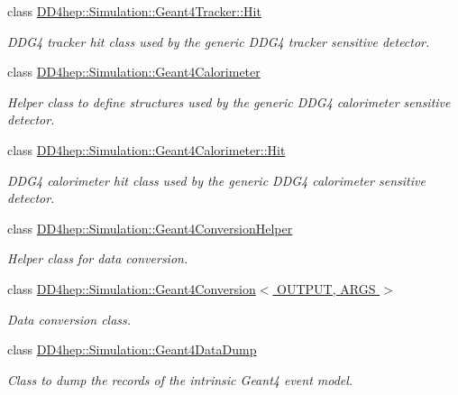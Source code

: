 \begin{DoxyCompactItemize}
class \hyperlink{class_d_d4hep_1_1_simulation_1_1_geant4_tracker_1_1_hit}{DD4hep::Simulation::Geant4Tracker::Hit}
\begin{DoxyCompactList}\small\item\em DDG4 tracker hit class used by the generic DDG4 tracker sensitive detector. \item\end{DoxyCompactList}\item 
class \hyperlink{class_d_d4hep_1_1_simulation_1_1_geant4_calorimeter}{DD4hep::Simulation::Geant4Calorimeter}
\begin{DoxyCompactList}\small\item\em Helper class to define structures used by the generic DDG4 calorimeter sensitive detector. \item\end{DoxyCompactList}\item 
class \hyperlink{class_d_d4hep_1_1_simulation_1_1_geant4_calorimeter_1_1_hit}{DD4hep::Simulation::Geant4Calorimeter::Hit}
\begin{DoxyCompactList}\small\item\em DDG4 calorimeter hit class used by the generic DDG4 calorimeter sensitive detector. \item\end{DoxyCompactList}\item 
class \hyperlink{class_d_d4hep_1_1_simulation_1_1_geant4_conversion_helper}{DD4hep::Simulation::Geant4ConversionHelper}
\begin{DoxyCompactList}\small\item\em Helper class for data conversion. \item\end{DoxyCompactList}\item 
class \hyperlink{class_d_d4hep_1_1_simulation_1_1_geant4_conversion}{DD4hep::Simulation::Geant4Conversion$<$ OUTPUT, ARGS $>$}
\begin{DoxyCompactList}\small\item\em Data conversion class. \item\end{DoxyCompactList}\item 
class \hyperlink{class_d_d4hep_1_1_simulation_1_1_geant4_data_dump}{DD4hep::Simulation::Geant4DataDump}
\begin{DoxyCompactList}\small\item\em Class to dump the records of the intrinsic Geant4 event model. \item\end{DoxyCompactList}\item 

\end{DoxyCompactItemize}
